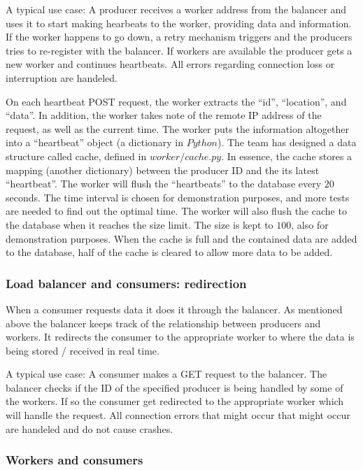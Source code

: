 \documentclass{sigchi}
\begin{document}
A typical use case:
A producer receives a worker address from the balancer and uses it to start making hearbeats to the worker, providing data and information. If the worker happens to go down, a retry mechanism triggers and the producers tries to re-register with the balancer. If workers are available the producer gets a new worker and continues heartbeats. All errors regarding connection loss or interruption are handeled.

On each heartbeat POST request, the worker extracts the \enquote{id}, \enquote{location}, and \enquote{data}. In addition, the worker takes note of the remote IP address of the request, as well as the current time. The worker puts the information altogether into a \enquote{heartbeat} object (a dictionary in $Python$). The team has designed a data structure called cache, defined in $worker/cache.py$. In essence, the cache stores a mapping (another dictionary) between the producer ID and the its latest \enquote{heartbeat}. The worker will flush the \enquote{heartbeats} to the database every $20$ seconds. The time interval is chosen for demonstration purposes, and more tests are needed to find out the optimal time. The worker will also flush the cache to the database when it reaches the size limit. The size is kept to $100$, also for demonstration purposes. When the cache is full and the contained data are added to the database, half of the cache is cleared to allow more data to be added.

\subsubsection{Load balancer and consumers: redirection}

When a consumer requests data it does it through the balancer. As mentioned above the balancer keeps track of the relationship between producers and workers. It redirects the consumer to the appropriate worker to where the data is being stored / received in real time.

A typical use case:
A consumer makes a GET request to the balancer. The balancer checks if the ID of the specified producer is being handled by some of the workers. If so the consumer get redirected to the appropriate worker which will handle the request. All connection errors that might occur that might occur are handeled and do not cause crashes.

\subsubsection{Workers and consumers}
\end{document}
